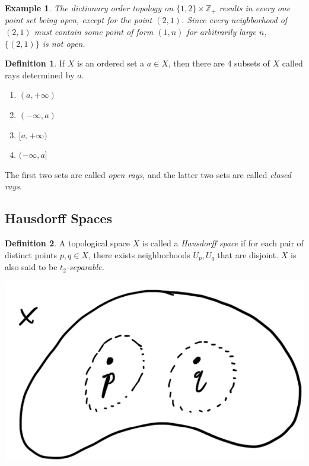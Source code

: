 \documentclass{article}
\newtheorem{example}{Example}[section]
\theoremstyle{remark}
\theoremstyle{definition}
\newtheorem{definition}{Definition}[section]
\begin{document}
\begin{example}
The dictionary order topology on $\{1, 2\} \times \mathbb{Z}_+$ results in every one point set being open, except for the point $(2, 1)$. Since every neighborhood of $(2,1)$ must contain some point of form $(1, n)$ for arbitrarily large $n$, $\{(2,1)\}$ is not open. 
\end{example}

\begin{definition}
If $X$ is an ordered set a $a \in X$, then there are 4 subsets of $X$ called rays determined by $a$. 
\begin{enumerate}
    \item $(a, +\infty)$ 
    \item $(-\infty, a)$
    \item $[a, +\infty)$
    \item $(-\infty, a]$
\end{enumerate}
The first two sets are called \textit{open rays}, and the latter two sets are called \textit{closed rays}. 
\end{definition}

\subsection{Hausdorff Spaces}
\begin{definition}
A topological space $X$ is called a \textit{Hausdorff space} if for each pair of distinct points $p, q \in X$, there exists neighborhoods $U_p, U_q$ that are disjoint. $X$ is also said to be \textit{$t_2$-separable.}
\begin{center}
    \includegraphics[scale=0.35]{img/Hausdorff_Space_Separability.PNG}
\end{center}
\end{definition}
\end{document}
